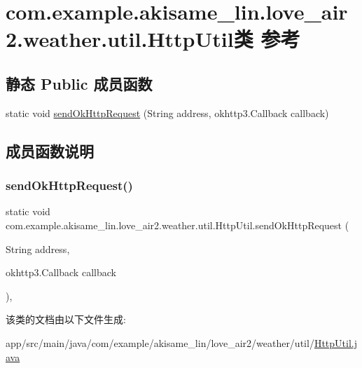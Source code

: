 \hypertarget{classcom_1_1example_1_1akisame__lin_1_1love__air2_1_1weather_1_1util_1_1_http_util}{}\section{com.\+example.\+akisame\+\_\+lin.\+love\+\_\+air2.\+weather.\+util.\+Http\+Util类 参考}
\label{classcom_1_1example_1_1akisame__lin_1_1love__air2_1_1weather_1_1util_1_1_http_util}
\subsection*{静态 Public 成员函数}
\begin{DoxyCompactItemize}
\item 
static void \mbox{\hyperlink{classcom_1_1example_1_1akisame__lin_1_1love__air2_1_1weather_1_1util_1_1_http_util_aa8efa0f67f1411dee972b9280011ec31}{send\+Ok\+Http\+Request}} (String address, okhttp3.\+Callback callback)
\end{DoxyCompactItemize}


\subsection{成员函数说明}
\mbox{\label{classcom_1_1example_1_1akisame__lin_1_1love__air2_1_1weather_1_1util_1_1_http_util_aa8efa0f67f1411dee972b9280011ec31}} 
\subsubsection{\texorpdfstring{sendOkHttpRequest()}{sendOkHttpRequest()}}
{\footnotesize\ttfamily static void com.\+example.\+akisame\+\_\+lin.\+love\+\_\+air2.\+weather.\+util.\+Http\+Util.\+send\+Ok\+Http\+Request (\begin{DoxyParamCaption}\item[{String}]{address,  }\item[{okhttp3.\+Callback}]{callback }\end{DoxyParamCaption})\hspace{0.3cm}{\ttfamily [inline]}, {\ttfamily [static]}}



该类的文档由以下文件生成\+:\begin{DoxyCompactItemize}
\item 
app/src/main/java/com/example/akisame\+\_\+lin/love\+\_\+air2/weather/util/\mbox{\hyperlink{java_2com_2example_2akisame__lin_2love__air2_2weather_2util_2_http_util_8java}{Http\+Util.\+java}}\end{DoxyCompactItemize}
